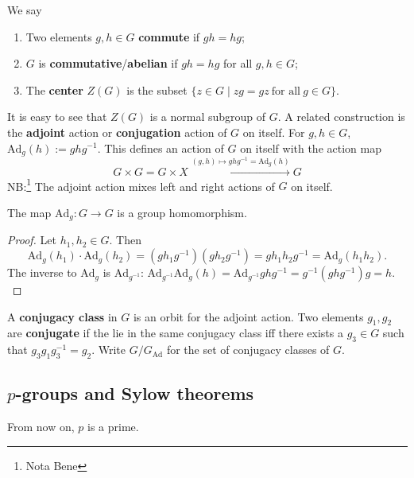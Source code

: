 \begin{definition}[]
   We say
   \begin{enumerate}[label=(\alph*)]
   \setlength\itemsep{-.2em}
       \item Two elements $g,h \in G$ \textbf{commute} if $gh=hg$; 
        \item $G$ is \textbf{commutative}/\textbf{abelian} if $gh=hg$ for all $g,h \in G$;
    \item The \textbf{center} $Z(G)$ is the subset $\{z \in G \mid zg=gz \ \text{for all} \ g \in G\} $. 
   \end{enumerate}
\end{definition}
It is easy to see that $Z(G)$ is a normal subgroup of $G$. A related construction is the \textbf{adjoint} action or \textbf{conjugation} action of $G$ on itself. For $g,h \in G$, $\mathrm{Ad}_g(h):=gh g^{-1}$. This defines an action of $G$ on itself with the action map \[
    G \times G =G \times X \xrightarrow{(g,h) \mapsto  ghg^{-1}=\mathrm{Ad}_g(h)} G
\] NB:\footnote{Nota Bene} The adjoint action mixes left and right actions of $G$ on itself.

\begin{lemma}
    The map $\mathrm{Ad}_g\colon G \to G$ is a group homomorphism.
\end{lemma}
\begin{proof}
    Let $h_1,h_2 \in G$. Then \[
        \mathrm{Ad}_g(h_1) \cdot \mathrm{Ad}_g(h_2)=(g h_1 g^{-1})(g h_2 g^{-1})=gh_1h_2 g^{-1}=\mathrm{Ad}_g(h_1h_2).
    \] The inverse to $\mathrm{Ad}_g$ is $\mathrm{Ad}_{g^{-1}}$: $\mathrm{Ad}_{g^{-1}} \mathrm{Ad}_g(h)=\mathrm{Ad}_{g^{-1}}ghg^{-1}=g^{-1}(ghg^{-1})g=h .$
\end{proof}

\begin{definition}[]
    A \textbf{conjugacy class} in $G$ is an orbit for the adjoint action. Two elements $g_1,g_2$ are \textbf{conjugate} if the lie in the same conjugacy class iff there exists a $g_3 \in G$ such that $g_3g_1g_3^{-1}=g_2$. Write $G / G_{ \mathrm{Ad}}$ for the set of conjugacy classes of $G$.
\end{definition}

\subsection{$p$-groups and Sylow theorems}
From now on, $p$ is a prime.

